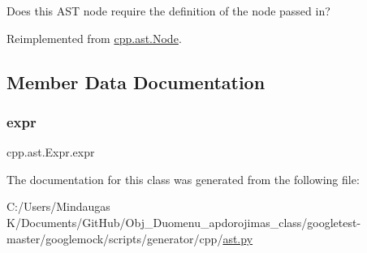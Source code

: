 \begin{DoxyVerb}Does this AST node require the definition of the node passed in?\end{DoxyVerb}
 

Reimplemented from \mbox{\hyperlink{classcpp_1_1ast_1_1_node_a31ae211f954a8c578ef16226df5ac8c8}{cpp.\+ast.\+Node}}.



\subsection{Member Data Documentation}
\mbox{\label{classcpp_1_1ast_1_1_expr_a2f4e13fb0176f2616f8703103c806462}} 
\subsubsection{\texorpdfstring{expr}{expr}}
{\footnotesize\ttfamily cpp.\+ast.\+Expr.\+expr}



The documentation for this class was generated from the following file\+:\begin{DoxyCompactItemize}
\item 
C\+:/\+Users/\+Mindaugas K/\+Documents/\+Git\+Hub/\+Obj\+\_\+\+Duomenu\+\_\+apdorojimas\+\_\+class/googletest-\/master/googlemock/scripts/generator/cpp/\mbox{\hyperlink{googletest-master_2googlemock_2scripts_2generator_2cpp_2ast_8py}{ast.\+py}}\end{DoxyCompactItemize}
